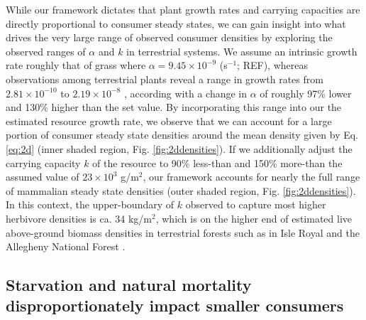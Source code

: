 \documentclass[11pt]{article}
\begin{document}
While our framework dictates that plant growth rates and carrying capacities are directly proportional to consumer steady states, we can gain insight into what drives the very large range of observed consumer densities by exploring the observed ranges of $\alpha$ and $k$ in terrestrial systems.
We assume an intrinsic growth rate roughly that of grass where $\alpha = 9.45\times 10^{-9}$ (s${}^{-1}$; REF), whereas observations among terrestrial plants reveal a range in growth rates from $2.81\times 10^{-10}$ to $2.19\times 10^{-8}$ \citep{michaletz2014convergence}, according with a change in $\alpha$ of roughly 97\% lower and 130\% higher than the set value. 
By incorporating this range into our the estimated resource growth rate, we observe that we can account for a large portion of consumer steady state densities around the mean density given by Eq. \ref{eq:2d} (inner shaded region, Fig. \ref{fig:2ddensities}).
If we additionally adjust the carrying capacity $k$ of the resource to 90\% less-than and 150\% more-than the assumed value of $23\times 10^3$ g/m${}^2$, our framework accounts for nearly the full range of mammalian steady state densities (outer shaded region, Fig. \ref{fig:2ddensities}).
In this context, the upper-boundary of $k$ observed to capture most higher herbivore densities is ca. 34 kg/m${}^2$, which is on the higher end of estimated live above-ground biomass densities in terrestrial forests such as in Isle Royal and the Allegheny National Forest \citep{de2017simulating}.



\subsection*{Starvation and natural mortality disproportionately impact smaller consumers}
\end{document}
